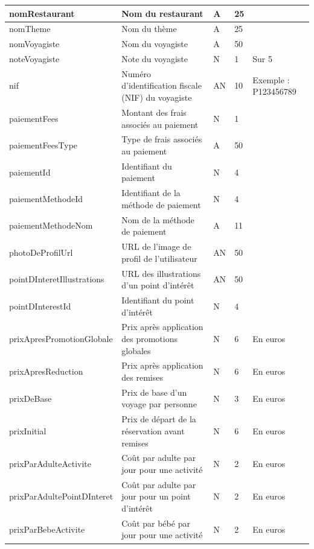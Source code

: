 \documentclass[12pt]{report}
\begin{document}
\begin{longtable}{|p{4cm}|p{4cm}|p{1cm}|p{1cm}|p{4cm}|}
				\hline
				nomRestaurant & Nom du restaurant & A & 25 & \\						
				\hline
				nomTheme & Nom du thème & A & 25 & \\						
				\hline
				nomVoyagiste & Nom du voyagiste & A & 50 & \\						
				\hline
				noteVoyagiste & Note du voyagiste & N & 1 & Sur 5 \\						
				\hline
				nif & Numéro d'identification fiscale (NIF) du voyagiste & AN & 10 & Exemple : P123456789 \\						
				\hline
				paiementFees & Montant des frais associés au paiement & N & 1 & \\						
				\hline
				paiementFeesType & Type de frais associés au paiement & A & 50 & \\						
				\hline
				paiementId & Identifiant du paiement & N & 4 & \\						
				\hline
				paiementMethodeId & Identifiant de la méthode de paiement & N & 4 & \\						
				\hline
				paiementMethodeNom & Nom de la méthode de paiement & A & 11 & \\						
				\hline
				photoDeProfilUrl & URL de l'image de profil de l'utilisateur & AN & 50 & \\						
				\hline
				pointDInteretIllustrations & URL des illustrations d'un point d'intérêt & AN & 50 & \\						
				\hline
				pointDInterestId & Identifiant du point d'intérêt & N & 4 & \\						
				\hline
				prixApresPromotionGlobale & Prix après application des promotions globales & N & 6 & En euros \\						
				\hline
				prixApresReduction & Prix après application des remises & N & 6 & En euros \\						
				\hline
				prixDeBase & Prix de base d'un voyage par personne & N & 3 & En euros \\						
				\hline
				prixInitial & Prix de départ de la réservation avant remises & N & 6 & En euros \\						
				\hline
				prixParAdulteActivite & Coût par adulte par jour pour une activité & N & 2 & En euros \\						
				\hline
				prixParAdultePointDInteret & Coût par adulte par jour pour un point d'intérêt & N & 2 & En euros \\						
				\hline
				prixParBebeActivite & Coût par bébé par jour pour une activité & N & 2 & En euros \\						

\end{longtable}
\end{document}
